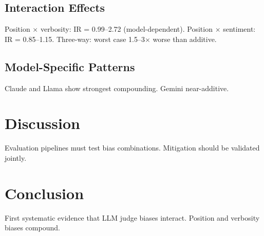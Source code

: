 \documentclass[11pt]{article}
\begin{document}
\subsection{Interaction Effects}
Position $\times$ verbosity: IR = 0.99--2.72 (model-dependent).
Position $\times$ sentiment: IR = 0.85--1.15.
Three-way: worst case 1.5--3$\times$ worse than additive.

\subsection{Model-Specific Patterns}
Claude and Llama show strongest compounding. Gemini near-additive.

\section{Discussion}
Evaluation pipelines must test bias combinations. Mitigation should be validated jointly.

\section{Conclusion}
First systematic evidence that LLM judge biases interact. Position and verbosity biases compound.



\end{document}
